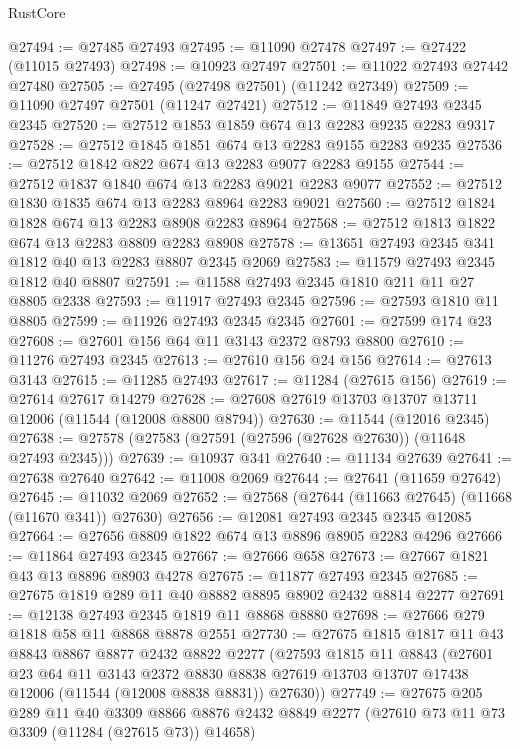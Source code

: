 \begin{lexlean}{RustCore}
\begin{coremodule}
@27494 := @27485 @27493
@27495 := @11090 @27478
@27497 := @27422 (@11015 @27493)
@27498 := @10923 @27497
@27501 := @11022 @27493 @27442 @27480
@27505 := @27495 (@27498 @27501) (@11242 @27349)
@27509 := @11090 @27497 @27501 (@11247 @27421)
@27512 := @11849 @27493 @2345 @2345
@27520 := @27512 @1853 @1859 @674 @13 @2283 @9235 @2283 @9317
@27528 := @27512 @1845 @1851 @674 @13 @2283 @9155 @2283 @9235
@27536 := @27512 @1842 @822 @674 @13 @2283 @9077 @2283 @9155
@27544 := @27512 @1837 @1840 @674 @13 @2283 @9021 @2283 @9077
@27552 := @27512 @1830 @1835 @674 @13 @2283 @8964 @2283 @9021
@27560 := @27512 @1824 @1828 @674 @13 @2283 @8908 @2283 @8964
@27568 := @27512 @1813 @1822 @674 @13 @2283 @8809 @2283 @8908
@27578 := @13651 @27493 @2345 @341 @1812 @40 @13 @2283 @8807 @2345 @2069
@27583 := @11579 @27493 @2345 @1812 @40 @8807
@27591 := @11588 @27493 @2345 @1810 @211 @11 @27 @8805 @2338
@27593 := @11917 @27493 @2345
@27596 := @27593 @1810 @11 @8805
@27599 := @11926 @27493 @2345 @2345
@27601 := @27599 @174 @23
@27608 := @27601 @156 @64 @11 @3143 @2372 @8793 @8800
@27610 := @11276 @27493 @2345
@27613 := @27610 @156 @24 @156
@27614 := @27613 @3143
@27615 := @11285 @27493
@27617 := @11284 (@27615 @156)
@27619 := @27614 @27617 @14279
@27628 := @27608 @27619 @13703 @13707 @13711 @12006 (@11544 (@12008 @8800 @8794))
@27630 := @11544 (@12016 @2345)
@27638 := @27578 (@27583 (@27591 (@27596 (@27628 @27630)) (@11648 @27493 @2345)))
@27639 := @10937 @341
@27640 := @11134 @27639
@27641 := @27638 @27640
@27642 := @11008 @2069
@27644 := @27641 (@11659 @27642)
@27645 := @11032 @2069
@27652 := @27568 (@27644 (@11663 @27645) (@11668 (@11670 @341)) @27630)
@27656 := @12081 @27493 @2345 @2345 @12085
@27664 := @27656 @8809 @1822 @674 @13 @8896 @8905 @2283 @4296
@27666 := @11864 @27493 @2345
@27667 := @27666 @658
@27673 := @27667 @1821 @43 @13 @8896 @8903 @4278
@27675 := @11877 @27493 @2345
@27685 := @27675 @1819 @289 @11 @40 @8882 @8895 @8902 @2432 @8814 @2277
@27691 := @12138 @27493 @2345 @1819 @11 @8868 @8880
@27698 := @27666 @279 @1818 @58 @11 @8868 @8878 @2551
@27730 := @27675
    @1815
    @1817
    @11
    @43
    @8843
    @8867
    @8877
    @2432
    @8822
    @2277
    (@27593
      @1815
      @11
      @8843
      (@27601
        @23
        @64
        @11
        @3143
        @2372
        @8830
        @8838
        @27619
        @13703
        @13707
        @17438
        @12006
        (@11544 (@12008 @8838 @8831))
        @27630))
@27749 := @27675
    @205
    @289
    @11
    @40
    @3309
    @8866
    @8876
    @2432
    @8849
    @2277
    (@27610 @73 @11 @73 @3309 (@11284 (@27615 @73)) @14658)

\end{coremodule}
\end{lexlean}
